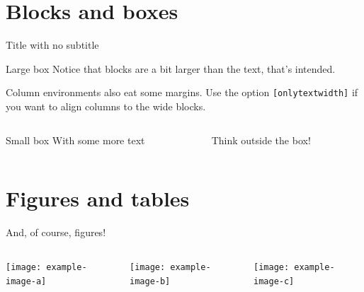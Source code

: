 \documentclass[11pt,aspectratio=169]{beamer}
\begin{document}
\section{Blocks and boxes}

\begin{frame}{Title with no subtitle}

	\begin{block}{Large box}
	Notice that blocks are a bit larger than the text, that's intended.
	\end{block}
	
	Column environments also eat some margins. Use the option \texttt{[onlytextwidth]} if you want to align columns to the wide blocks.
	
	\begin{columns}[onlytextwidth]
	\begin{column}{0.45\textwidth}
		\begin{block}{Small box}
		With some more text
		\end{block}
	\end{column}
	\begin{column}{0.5\textwidth}
		Think outside the box!
	\end{column}
	\end{columns}

\end{frame}

\section{Figures and tables}

\begin{frame}{And, of course, figures!}
	
	\begin{columns}
		\begin{column}{0.33\textwidth}
			\texttt{[image: example-image-a]}
		\end{column}
		\begin{column}{0.33\textwidth}
			\texttt{[image: example-image-b]}
		\end{column}
		\begin{column}{0.33\textwidth}
			\texttt{[image: example-image-c]}
		\end{column}
	\end{columns}

\end{frame}
\end{document}
